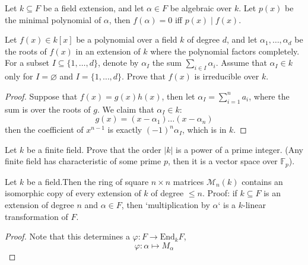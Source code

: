 \documentclass[openany]{book}
\newcommand{\F}{\mathbb{F}}
\let\emptyset\varnothing
\begin{document}
\begin{prop}
Let \( k \subseteq F \) be a field extension, and let \(\alpha \in F\) be algebraic over \(k\). Let $p(x)$ be the minimal polynomial of $\alpha$, then $f(\alpha)=0$ iff $p(x) \mid f(x)$. 
\end{prop}

\begin{prob}
Let \( f(x) \in k[x] \) be a polynomial over a field \( k \) of degree \( d \), and let \(\alpha_1, \ldots, \alpha_d\) be the roots of \( f(x) \) in an extension of \( k \) where the polynomial factors completely. For a subset \( I \subseteq \{1, \ldots, d\} \), denote by \(\alpha_I\) the sum \(\sum_{i \in I} \alpha_i\). Assume that \(\alpha_I \in k\) only for \( I = \emptyset \) and \( I = \{1, \ldots, d\} \). Prove that \( f(x) \) is irreducible over \( k \).
\end{prob}
\begin{proof}
    Suppose that $f(x)=g(x)h(x)$, then let $\alpha_I=\sum_{i=1}^na_i$, where the sum is over the roots of $g$. We claim that $\alpha_I\in k$: 
    \begin{equation*}
        g(x)=(x-\alpha_1)\dots(x-\alpha_n)
    \end{equation*} 
    then the coefficient of $x^{n-1}$ is exactly $(-1)^n\alpha_I$, which is in $k$.
\end{proof}

\begin{prop}
Let \( k \) be a finite field. Prove that the order \(|k|\) is a power of a prime integer. (Any finite field has characteristic of some prime $p$, then it is a vector space over $\F_p$).
\end{prop}


\begin{prop}
Let \( k \) be a field.Then the ring of square \( n \times n \) matrices \(\mathcal{M}_n(k)\) contains an isomorphic copy of every extension of \( k \) of degree \(\leq n\). Proof: if \( k \subseteq F \) is an extension of degree \( n \) and \(\alpha \in F\), then `multiplication by \(\alpha\)` is a \(k\)-linear transformation of \(F\).
\end{prop}
\begin{proof}
    Note that this determines a  $\varphi: F\to\text{End}_kF$, 
    \begin{equation*}
        \varphi:\alpha\mapsto M_\alpha
    \end{equation*}
\end{proof}
\end{document}
